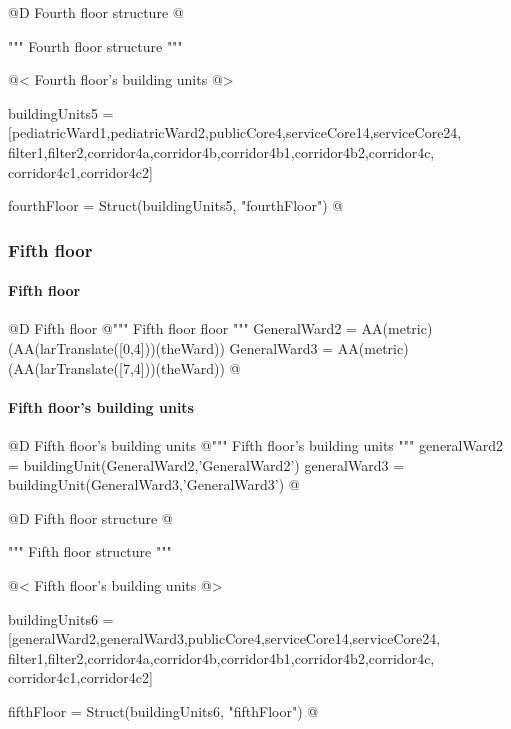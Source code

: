 \documentclass[11pt,oneside]{article}    %
\begin{document}
@D Fourth floor structure
@{""" Fourth floor structure """

@< Fourth floor's building units @>

buildingUnits5 = [pediatricWard1,pediatricWard2,publicCore4,serviceCore14,serviceCore24,
                filter1,filter2,corridor4a,corridor4b,corridor4b1,corridor4b2,corridor4c,
                corridor4c1,corridor4c2]

fourthFloor = Struct(buildingUnits5, "fourthFloor")
@}


\subsubsection{Fifth floor}
\paragraph{Fifth floor}
@D Fifth floor
@{""" Fifth floor floor """
GeneralWard2 = AA(metric)(AA(larTranslate([0,4]))(theWard))
GeneralWard3 = AA(metric)(AA(larTranslate([7,4]))(theWard))
@}


\paragraph{Fifth floor's building units}
@D Fifth floor's building units 
@{""" Fifth floor's building units """
generalWard2 = buildingUnit(GeneralWard2,'GeneralWard2')
generalWard3 = buildingUnit(GeneralWard3,'GeneralWard3')
@}

@D Fifth floor structure
@{""" Fifth floor structure """

@< Fifth floor's building units @>

buildingUnits6 = [generalWard2,generalWard3,publicCore4,serviceCore14,serviceCore24,
                filter1,filter2,corridor4a,corridor4b,corridor4b1,corridor4b2,corridor4c,
                corridor4c1,corridor4c2]

fifthFloor = Struct(buildingUnits6, "fifthFloor")
@}
\end{document}
